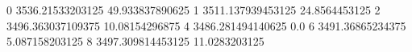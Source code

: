 0 3536.21533203125 49.933837890625
1 3511.137939453125 24.8564453125
2 3496.363037109375 10.08154296875
4 3486.281494140625 0.0
6 3491.36865234375 5.087158203125
8 3497.309814453125 11.0283203125
